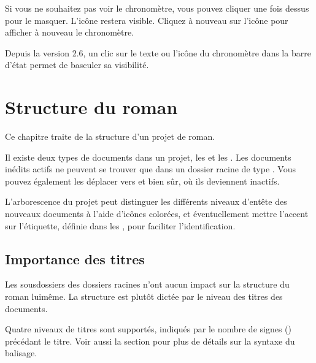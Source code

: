 \documentclass[a4paper,11pt,french]{sphinxmanual}
\begin{document}
\sphinxAtStartPar
Si vous ne souhaitez pas voir le chronomètre, vous pouvez cliquer une fois dessus pour le masquer. L’icône restera visible. Cliquez à nouveau sur l’icône pour afficher à nouveau le chronomètre.

\sphinxAtStartPar
{}Depuis la version 2.6, un clic sur le texte ou l’icône du chronomètre dans la barre d’état permet de basculer sa visibilité.

\sphinxstepscope


\chapter{Structure du roman}
\label{\detokenize{project_structure:novel-structure}}\label{\detokenize{project_structure:a-struct}}\label{\detokenize{project_structure::doc}}
\sphinxAtStartPar
Ce chapitre traite de la structure d’un projet de roman.

\sphinxAtStartPar
Il existe deux types de documents dans un projet, les  et les . Les documents inédits actifs ne peuvent se trouver que dans un dossier racine de type . Vous pouvez également les déplacer vers  et  bien sûr, où ils deviennent inactifs.

\sphinxAtStartPar
L’arborescence du projet peut distinguer les différents niveaux d’en\sphinxhyphen{}tête des nouveaux documents à l’aide d’icônes colorées, et éventuellement mettre l’accent sur l’étiquette, définie dans les , pour faciliter l’identification.


\section{Importance des titres}
\label{\detokenize{project_structure:importance-of-headings}}\label{\detokenize{project_structure:a-struct-heads}}
\sphinxAtStartPar
Les sous\sphinxhyphen{}dossiers des dossiers racines n’ont aucun impact sur la structure du roman lui\sphinxhyphen{}même. La structure est plutôt dictée par le niveau des titres des documents.

\sphinxAtStartPar
Quatre niveaux de titres sont supportés, indiqués par le nombre de signes (\sphinxcode{\sphinxupquote{\#}}) précédant le titre. Voir aussi la section {\hyperref[\detokenize{usage_format:a-fmt}]{}} pour plus de détails sur la syntaxe du balisage.
\end{document}
